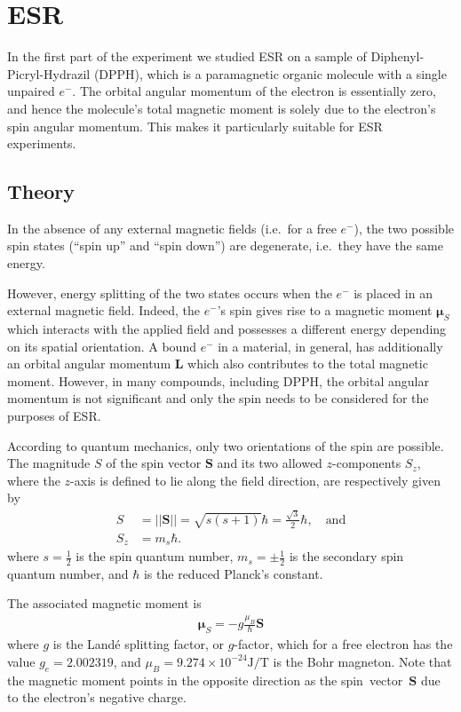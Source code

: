 \documentclass[a4paper]{jpconf}
\numberwithin{equation}{section}
\begin{document}
\section{ESR}
In the first part of the experiment we studied ESR on a sample of Diphenyl-Picryl-Hydrazil (DPPH), which is a paramagnetic organic molecule with a single unpaired $e^-$. The orbital angular momentum of the electron is essentially zero,    %
and hence the molecule\textquoteright s total magnetic moment is solely due to the electron\textquoteright s spin angular momentum. This makes it particularly suitable for ESR experiments.
 
\subsection{Theory}\label{section: theory}
In the absence of any external magnetic fields (i.e.\ for a free $e^-$), the two possible spin states (``spin up'' and ``spin down'') are degenerate, i.e.\ they have the same energy.

However, energy splitting of the two states occurs when the $e^-$ is placed in an external magnetic field. Indeed, the $e^-$'s spin gives rise to a magnetic moment $\bm{\mu}_S$ which interacts with the applied field and possesses a different energy depending on its spatial orientation. A bound $e^-$ in a material, in general, has additionally an orbital angular momentum $\mathbf{L}$ which also contributes to the total magnetic moment. However, in many compounds, including DPPH, the orbital angular momentum is not significant and only the spin needs to be considered for the purposes of ESR. 

According to quantum mechanics, only two orientations of the spin are possible. The magnitude $S$ of the spin vector $\mathbf{S}$ and its two allowed $z$-components $S_z$, where the $z$-axis is defined to lie along the field direction, are respectively given by
\begin{align}
	S &= \lvert\lvert\mathbf{S}\rvert\rvert = \sqrt{s(s+1)}\hbar = \tfrac{\sqrt{3}}{2}\hbar,  \quad \text{and} \nonumber \\
	S_z &= m_s \hbar. \label{eqn: magnetic moment z-projection}
\end{align}
where $s=\tfrac12$ is the spin quantum number, $m_s=\pm\tfrac12$ is the secondary spin quantum number, and $\hbar$ is the reduced Planck\textquoteright s constant.

The associated magnetic moment is
\begin{align}
	\bm{\mu}_S = - g \frac{\mu_B}{\hbar} \mathbf{S} \label{eqn: magnetic moment}
\end{align}
where $g$ is the Land\'e splitting factor, or $g$-factor, which for a free electron has the value $g_e = 2.002319$, and $\mu_B = 9.274 \times 10^{-24} \si{\joule\per\tesla}$ is the Bohr magneton. Note that the magnetic moment points in the opposite direction as the spin~vector~$\mathbf{S}$ due to the electron's negative charge.
\end{document}
